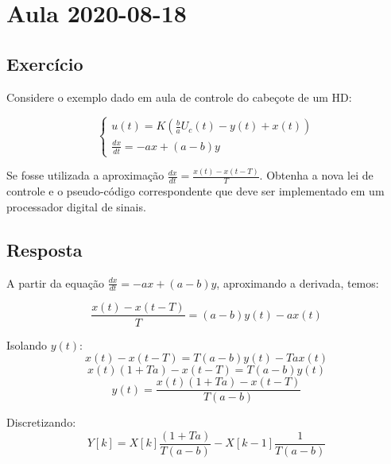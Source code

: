 \documentclass[a4paper,11pt]{article}
\title{\tituloRelatorio}
\author{Rafael Lima}
\begin{document}

\section{Aula 2020-08-18}
\subsection{Exercício}
Considere o exemplo dado em aula de controle do cabeçote de um HD:

$$
\left\{
\begin{array}{l}
    u(t) = K\left(\frac{b}{a}U_c(t) - y(t) + x(t)\right)\\
    \frac{dx}{dt} = -ax + (a-b)y
\end{array}
\right.
$$

Se fosse utilizada a aproximação $\frac{dx}{dt} = \frac{x(t)- x(t-T)}{T}$. Obtenha a nova lei de controle e o pseudo-código correspondente que deve ser implementado em um processador digital de sinais.

\subsection{Resposta}

A partir da equação $\frac{dx}{dt} = -ax + (a-b)y$, aproximando a derivada, temos:

$$\frac{x(t) - x(t-T)}{T} = (a-b) y(t) - a x(t)$$

Isolando $y(t)$:
$$x(t) - x(t-T) = T (a-b) y(t) - T a x(t)$$
$$x(t)( 1 + T a) - x(t-T) = T (a-b) y(t)$$
$$y(t) =\frac{x(t)( 1 + T a) - x(t-T)}{T (a-b)}$$

Discretizando:
\begin{equation}
Y[k] = X[k]\frac{( 1 + T a)}{{T (a-b)}} - X[k-1]\frac{1}{{T (a-b)}}
\end{equation}


%
%


\end{document}
